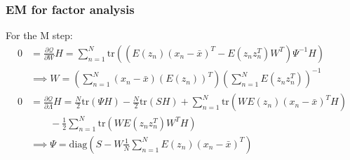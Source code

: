 \documentclass{beamer}
\begin{document}
\begin{frame}
    \frametitle{EM for factor analysis}
    For the M step:
    \begin{align*}
        0&=\frac{\partial\mathcal{Q}}{\partial{}W}H=\sum_{n=1}^{N}\mathrm{tr}((E(z_{n})(x_{n}-\bar{x})^{T}-E(z_{n}z_{n}^{T})W^{T})\Psi^{-1}H) \\
        &\implies{}W=(\sum_{n=1}^{N}(x_{n}-\bar{x})(E(z_{n}))^{T})(\sum_{n=1}^{N}E(z_{n}z_{n}^{T}))^{-1} \\
        0&=\frac{\partial\mathcal{Q}}{\partial\Lambda}H=\frac{N}{2}\mathrm{tr}(\Psi{}H)-\frac{N}{2}\mathrm{tr}(SH)+\sum_{n=1}^{N}\mathrm{tr}(WE(z_{n})(x_{n}-\bar{x})^{T}H) \\
        &\qquad-\frac{1}{2}\sum_{n=1}^{N}\mathrm{tr}(WE(z_{n}z_{n}^{T})W^{T}H) \\
        &\implies\Psi=\mathrm{diag}(S-W\frac{1}{N}\sum_{n=1}^{N}E(z_{n})(x_{n}-\bar{x})^{T})
    \end{align*}
\end{frame}
\end{document}
